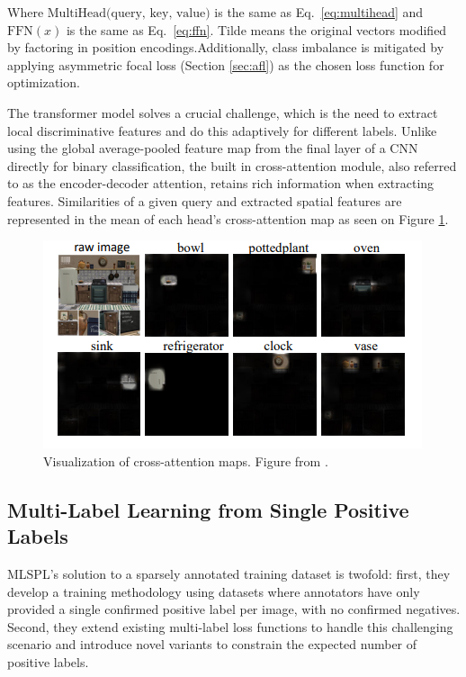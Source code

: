\documentclass[lettersize,journal]{IEEEtran}
\begin{document}
Where $\text{MultiHead(query, key, value)}$ is the same as Eq.~\ref{eq:multihead} and $\text{FFN}(x)$ is the same as Eq.~\ref{eq:ffn}. Tilde means the original vectors modified by factoring in position encodings.Additionally, class imbalance is mitigated by applying asymmetric focal loss (Section \ref{sec:afl}) as the chosen loss function for optimization.

The transformer model solves a crucial challenge, which is the need to extract local discriminative features and do this adaptively for different labels. Unlike using the global average-pooled feature map from the final layer of a CNN directly for binary classification, the built in cross-attention module, also referred to as the encoder-decoder attention, retains rich information when extracting features. Similarities of a given query and extracted spatial features are represented in the mean of each head's cross-attention map as seen on Figure \ref{fig:q2l_attention}.

\begin{figure}[t]
    \centering
    \includegraphics[width=.8\linewidth]{images/q2l_attention.PNG}
    \caption{Visualization of cross-attention maps. Figure from \cite{Query2Label}. }
    \label{fig:q2l_attention}
\end{figure}

\subsection{Multi-Label Learning from Single Positive Labels}
MLSPL's solution to a sparsely annotated training dataset is twofold: first, they develop a training methodology using datasets where annotators have only provided a single confirmed positive label per image, with no confirmed negatives. Second, they extend existing multi-label loss functions to handle this challenging scenario and introduce novel variants to constrain the expected number of positive labels.
\end{document}
